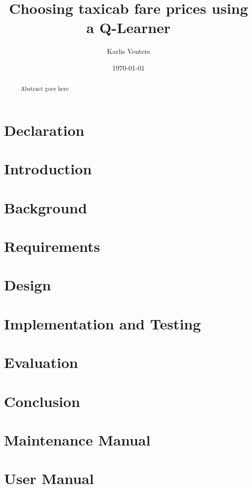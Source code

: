 \documentclass{csfourzero}
\title{Choosing taxicab fare prices using a Q-Learner}
\author{Karlis Venters}
\date{\today}
\begin{document}
\maketitle
% 

\begin{abstract}~
Abstract goes here
\end{abstract}

\newpage 
\section*{Declaration}


\newpage
\tableofcontents{}

\newpage
\listoffigures

\newpage
\section{Introduction}
\label{sec:intro}



\newpage
\section{Background}
\label{sec:literature}





\newpage
\section{Requirements}
\label{sec:requirements}


\newpage
\section{Design}
\label{sec:design}



\newpage
\section{Implementation and Testing}
\label{sec:implementation}



\newpage
\section{Evaluation}
\label{sec:evaluation}



\newpage
\section{Conclusion}
\label{sec:conclusion}


\newpage
\printbibliography

\newpage
\appendix
\section{Maintenance Manual}


\newpage
\section{User Manual}

\end{document}
